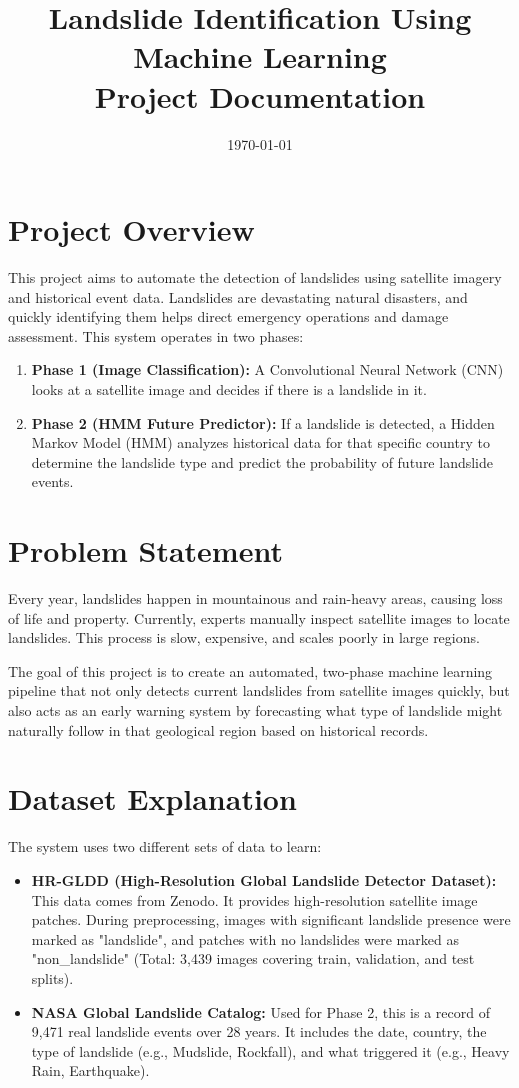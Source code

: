 \documentclass[12pt,a4paper]{article}
\title{\textbf{Landslide Identification Using Machine Learning\\ \large Project Documentation}}
\author{}
\date{\today}
\begin{document}
\maketitle
\tableofcontents
\newpage

\section{Project Overview}
This project aims to automate the detection of landslides using satellite imagery and historical event data. Landslides are devastating natural disasters, and quickly identifying them helps direct emergency operations and damage assessment. This system operates in two phases:
\begin{enumerate}
    \item \textbf{Phase 1 (Image Classification):} A Convolutional Neural Network (CNN) looks at a satellite image and decides if there is a landslide in it.
    \item \textbf{Phase 2 (HMM Future Predictor):} If a landslide is detected, a Hidden Markov Model (HMM) analyzes historical data for that specific country to determine the landslide type and predict the probability of future landslide events.
\end{enumerate}

\section{Problem Statement}
Every year, landslides happen in mountainous and rain-heavy areas, causing loss of life and property. Currently, experts manually inspect satellite images to locate landslides. This process is slow, expensive, and scales poorly in large regions.

The goal of this project is to create an automated, two-phase machine learning pipeline that not only detects current landslides from satellite images quickly, but also acts as an early warning system by forecasting what type of landslide might naturally follow in that geological region based on historical records.

\section{Dataset Explanation}
The system uses two different sets of data to learn:
\begin{itemize}
    \item \textbf{HR-GLDD (High-Resolution Global Landslide Detector Dataset):} This data comes from Zenodo. It provides high-resolution satellite image patches. During preprocessing, images with significant landslide presence were marked as "landslide", and patches with no landslides were marked as "non\_landslide" (Total: 3,439 images covering train, validation, and test splits).
    \item \textbf{NASA Global Landslide Catalog:} Used for Phase 2, this is a record of 9,471 real landslide events over 28 years. It includes the date, country, the type of landslide (e.g., Mudslide, Rockfall), and what triggered it (e.g., Heavy Rain, Earthquake).
\end{itemize}
\end{document}
